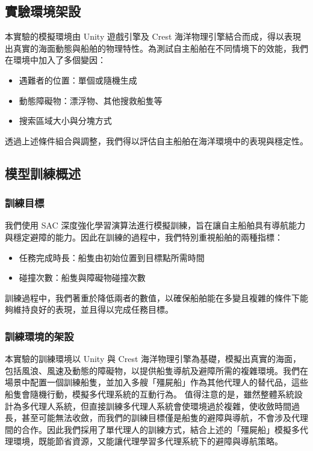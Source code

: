 \documentclass[12pt,a4paper]{article}
\begin{document}
\subsection{實驗環境架設}
本實驗的模擬環境由 Unity 遊戲引擎及 Crest 海洋物理引擎結合而成，得以表現出真實的海面動態與船舶的物理特性。為測試自主船舶在不同情境下的效能，我們在環境中加入了多個變因：
\begin{itemize}
    \item 遇難者的位置：單個或隨機生成
    \item 動態障礙物：漂浮物、其他搜救船隻等
    \item 搜索區域大小與分塊方式
\end{itemize}
透過上述條件組合與調整，我們得以評估自主船舶在海洋環境中的表現與穩定性。

\subsection{模型訓練概述}
\subsubsection{訓練目標}
我們使用 SAC 深度強化學習演算法進行模擬訓練，旨在讓自主船舶具有導航能力與穩定避障的能力。因此在訓練的過程中，我們特別重視船舶的兩種指標：
\begin{itemize}
    \item 任務完成時長：船隻由初始位置到目標點所需時間
    \item 碰撞次數：船隻與障礙物碰撞次數
\end{itemize}
訓練過程中，我們著重於降低兩者的數值，以確保船舶能在多變且複雜的條件下能夠維持良好的表現，並且得以完成任務目標。

\subsubsection{訓練環境的架設}
本實驗的訓練環境以 Unity 與 Crest 海洋物理引擎為基礎，模擬出真實的海面，包括風浪、風速及動態的障礙物，以提供船隻導航及避障所需的複雜環境。我們在場景中配置一個訓練船隻，並加入多艘「殭屍船」作為其他代理人的替代品，這些船隻會隨機行動，模擬多代理系統的互動行為。
值得注意的是，雖然整體系統設計為多代理人系統，但直接訓練多代理人系統會使環境過於複雜，使收斂時間過長，甚至可能無法收斂，而我們的訓練目標僅是船隻的避障與導航，不會涉及代理間的合作。因此我們採用了單代理人的訓練方式，結合上述的「殭屍船」模擬多代理環境，既能節省資源，又能讓代理學習多代理系統下的避障與導航策略。

\newpage
\end{document}
